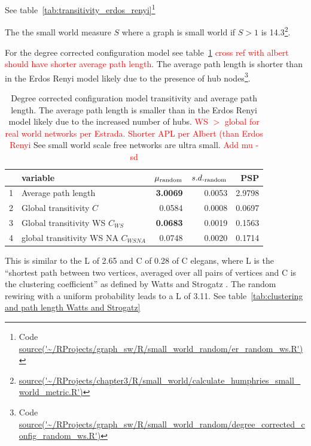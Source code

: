 See table~\ref{tab:transitivity_erdos_renyi}\footnote{Code \url{source('~/RProjects/graph_sw/R/small_world_random/er_random_ws.R')}}

The the small world measure $S$ where a graph is small world if $S>1$ \cite{humphries2008network} is 14.3\footnote{\url{source('~/RProjects/chapter3/R/small_world/calculate_humphries_small_world_metric.R')}}.


For the degree corrected configuration model see table~\ref{tab:cmtransitivity_configuration_model} \textcolor{red}{cross ref with albert should have shorter average path length}. The average path length is shorter than in the Erdos Renyi model likely due to the presence of hub nodes\footnote{ Code \url{source('~/RProjects/graph_sw/R/small_world_random/degree_corrected_config_random_ws.R')}}.



\begin{table}[ht]
\centering
\begin{tabular}{rlrrr}
  \hline
 & variable & $\mu\textsubscript{random}$ & $s.d.\textsubscript{random}$ & PSP \\ 
  \hline
1 & Average path length & \textbf{3.0069} & 0.0053 & 2.9798 \\ 
  2 & Global transitivity $C$ & 0.0584 & 0.0008 & 0.0697 \\ 
  3 & Global transitivity WS $C_{WS}$ &\textbf{ 0.0683} & 0.0019 & 0.1563 \\ 
  4 & global transitivity WS NA $C_{WSNA}$ & 0.0748 & 0.0020 & 0.1714 \\ 
   \hline
\end{tabular}
\caption{Degree corrected configuration model transitivity and average path length. The average path length is smaller than in the Erdos Renyi model likely due to the increased number of hubs. \textcolor{red}{WS $>$ global for real world networks per Estrada. Shorter APL per Albert (than Erdos Renyi} See small world scale free networks are ultra small. \textcolor{red}{Add mu - sd}}
\label{tab:cmtransitivity_configuration_model}
\end{table}

This is similar to the L of 2.65 and C of 0.28 of C elegans, where L is the ``shortest path between two vertices, averaged over all pairs of vertices and C is the clustering coefficient'' as defined by Watts and Strogatz \cite{watts1998collective}. The random rewiring with a uniform probability leads to a L of 3.11.  See table~\ref{tab:clustering and path length Watts and Strogatz}



